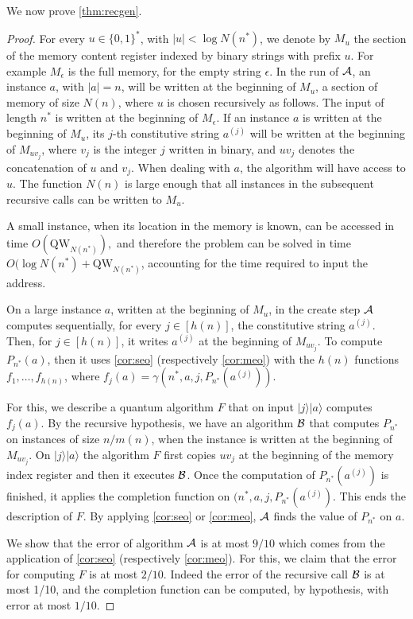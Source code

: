 \documentclass[12pt]{article}
\newcommand{\qw}{\mathrm{QW}}
\newcommand{\ket}[1]{|#1\rangle}
\theoremstyle{definition}
\begin{document}
We now prove \cref{thm:recgen}.
\begin{proof}
For every $u \in \{0,1\}^*$, with $|u| < \log N(n^*)$, we denote by $M_u$ the section of the memory content register indexed by binary strings with prefix $u$. For example $M_{\epsilon}$ is the full memory, for the empty string $\epsilon$.
In the run of ${\cal A}$, an instance $a$, with $|a|=n$, will be written at the beginning of $M_u$, a section of memory of size $N(n)$, where $u$ is chosen recursively as follows. The input of length $n^*$ is written at the beginning of $M_{\epsilon}$.  If an instance $a$ is written at the beginning of $M_u$, its $j$-th constitutive string $a^{(j)}$ will be written at the beginning of $M_{uv_j}$, where $v_j$ is the integer $j$ written in binary, and $uv_j$ denotes the concatenation of $u$ and $v_j$. When dealing with $a$, the algorithm will have access to $u$.
The function $N(n)$ is large enough that all instances in the subsequent recursive calls can be written to $M_u$.

A small instance, when its location in the memory is known,  can be accessed in time $O(\qw_{N(n^*)}),$ and therefore the problem can be solved in time $O(\log N(n^*) + \qw_{N(n^*)}$, accounting for the time required to input the address.

On a large instance $a$, written at the beginning of $M_u$, in the create step ${\cal A}$ computes sequentially, for every $j \in [h(n)]$, the constitutive string $a^{(j)}$. Then, for $j \in [h(n)]$, it writes $a^{(j)}$ at the beginning of $M_{uv_j}$. 
To compute $P_{n^*}(a)$, then it uses \cref{cor:seo} (respectively \cref{cor:meo}) with the $h(n)$ functions $f_1, \ldots , f_{h(n)}$, where $f_j(a) = \gamma(n^*, a, j, P_{n^*}(a^{(j)}))$.

For this, we describe a quantum algorithm $F$ that on input $\ket{j}\ket{a}$ computes $f_j(a)$. 
By the recursive hypothesis, we have an algorithm ${\cal B}$ that computes $P_{n^*}$ on instances of size $n/m(n)$, when the instance is written at the beginning of $M_{uv_j}$.
On $\ket{j}\ket{{a}}$ the algorithm $F$ first copies $uv_j$  at the beginning of the memory index register and then it executes ${\cal B}$.  
Once the computation of $P_{n^*}(a^{(j)})$ is finished, it applies the completion function on $(n^*, a, j, P_{n^*}(a^{(j)})$. This ends the description of $F$.
By applying \cref{cor:seo} or \cref{cor:meo}, ${\cal A}$ finds the value of $P_{n^*}$ on $a$. 

We show that the error of algorithm ${\cal A}$ is at most $9/10$ which comes from the application of \cref{cor:seo} (respectively \cref{cor:meo}).
For this, we claim that the error for computing $F$ is at most $2/10$.
Indeed the error of the recursive call ${\cal B}$ is at most 1/10, and the completion function can be computed, by hypothesis, with error at most $1/10$.


\end{proof}
\end{document}
